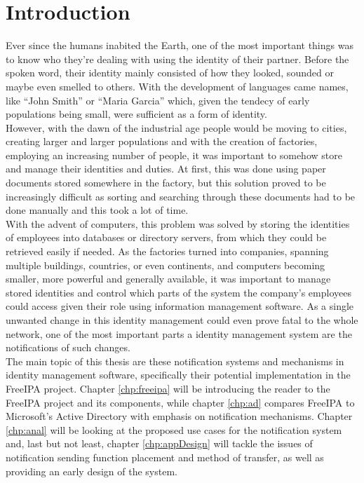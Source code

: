 
\chapter{Introduction}

Ever since the humans inabited the Earth, one of the most important things was to know who they're dealing with using the identity of their partner. Before the spoken word, their identity mainly consisted of how they looked, sounded or maybe even smelled to others.
With the development of languages came names, like ``John Smith'' or ``Maria Garcia'' which, given the tendecy of early populations being small, were sufficient as a form of identity. \\
However, with the dawn of the industrial age people would be moving to cities, creating larger and larger populations and with the creation of factories, employing an increasing number of people, it was important to somehow store and manage
their identities and duties. At first, this was done using paper documents stored somewhere in the factory, but this solution proved to be increasingly difficult as sorting and searching through these documents had to be done manually and this took a lot of time. \\
With the advent of computers, this problem was solved by storing the identities of employees into databases or directory servers, from which they could be retrieved easily if needed.
As the factories turned into companies, spanning multiple buildings, countries, or even continents, and computers becoming smaller, more powerful and generally available, it was important to manage stored identities
and control which parts of the system the company's employees could access given their role using information management software. As a single unwanted change in this identity management could even prove fatal to the whole network, one of the most important parts a identity management system are the notifications of such changes.\\
The main topic of this thesis are these notification systems and mechanisms in identity management software, specifically their potential implementation in the FreeIPA project.
Chapter \ref{chp:freeipa} will be introducing the reader to the FreeIPA project and its components, while chapter \ref{chp:ad} compares FreeIPA to Microsoft's Active Directory with emphasis on notification mechanisms.
Chapter \ref{chp:anal} will be looking at the proposed use cases for the notification system and, last but not least, chapter \ref{chp:appDesign} will tackle the issues of notification sending function placement and method of transfer, as well as providing an early design of the system.

